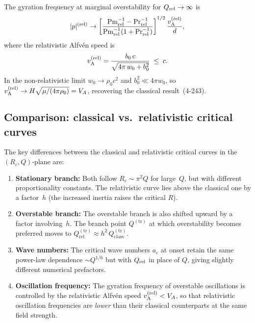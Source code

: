 The gyration frequency at marginal overstability for $Q_{\mathrm{rel}}\to\infty$ is
\begin{equation}
  |p|^{(\mathrm{rel})} \to
  \left[\frac{\mathrm{Pm}_{\mathrm{rel}}^{-1}
              -\mathrm{Pr}_{\mathrm{rel}}^{-1}}
             {\mathrm{Pm}_{\mathrm{rel}}^{-1}
              (1+\mathrm{Pr}_{\mathrm{rel}}^{-1})}
  \right]^{1/2}
  \frac{v_{\mathrm{A}}^{(\mathrm{rel})}}{d} ,
  \label{eq:rel-gyration}
\end{equation}
where the relativistic Alfv\'en speed is
\begin{equation}
  v_{\mathrm{A}}^{(\mathrm{rel})}
  = \frac{b_{0}\,c}{\sqrt{4\pi\,w_{0} + b_{0}^{2}}}
  \;\le\; c .
  \label{eq:rel-Alfven}
\end{equation}
In the non-relativistic limit $w_{0}\to\rho_{0}c^{2}$ and
$b_{0}^{2}\ll 4\pi w_{0}$, so
$v_{\mathrm{A}}^{(\mathrm{rel})}\to H\sqrt{\mu/(4\pi\rho_{0})} = V_{A}$, recovering
the classical result~(4-243).

\subsection{Comparison: classical vs.\ relativistic critical curves}
\label{subsec:rel-46-comparison}

\begin{relcorrection}
The key differences between the classical and relativistic critical curves
in the $(R_{c}, Q)$-plane are:

\begin{enumerate}
  \item \textbf{Stationary branch:} Both follow $R_{c}\sim\pi^{2}Q$ for
    large~$Q$, but with different proportionality constants.  The
    relativistic curve lies above the classical one by a factor~$h$
    (the increased inertia raises the critical $R$).

  \item \textbf{Overstable branch:} The overstable branch is also shifted
    upward by a factor involving~$h$.  The branch point $Q^{(\mathrm{tr})}$
    at which overstability becomes preferred moves to
    $Q_{\mathrm{rel}}^{(\mathrm{tr})} \approx h^{2}\,
    Q_{\mathrm{class}}^{(\mathrm{tr})}$.

  \item \textbf{Wave numbers:} The critical wave numbers $a_{c}$ at onset
    retain the same power-law dependence $\sim Q^{1/6}$ but with $Q_{\mathrm{rel}}$
    in place of $Q$, giving slightly different numerical prefactors.

  \item \textbf{Oscillation frequency:} The gyration frequency of
    overstable oscillations is controlled by the relativistic Alfv\'en
    speed $v_{\mathrm{A}}^{(\mathrm{rel})} < V_{A}$, so that relativistic oscillation
    frequencies are \emph{lower} than their classical counterparts at the
    same field strength.
\end{enumerate}
\end{relcorrection}

